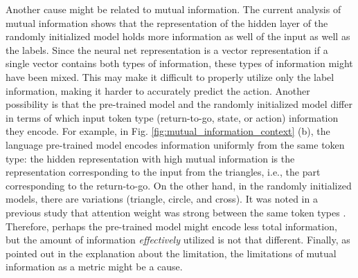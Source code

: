 \documentclass{article}
\begin{document}
Another cause might be related to mutual information. The current analysis of mutual information shows that the representation of the hidden layer of the randomly initialized model holds more information as well of the input as well as the labels. Since the neural net representation is a vector representation if a single vector contains both types of information, these types of information might have been mixed. This may make it difficult to properly utilize only the label information, making it harder to accurately predict the action. Another possibility is that the pre-trained model and the randomly initialized model differ in terms of which input token type (return-to-go, state, or action) information they encode. For example, in Fig. \ref{fig:mutual_information_context} (b), the language pre-trained model encodes information uniformly from the same token type: the hidden representation with high mutual information is the representation corresponding to the input from the triangles, i.e., the part corresponding to the return-to-go. On the other hand, in the randomly initialized models, there are variations (triangle, circle, and cross). It was noted in a previous study that attention weight was strong between the same token types \cite{reid2022can}. Therefore, perhaps the pre-trained model might encode less total information, but the amount of information \textit{effectively} utilized is not that different. Finally, as pointed out in the explanation about the limitation, the limitations of mutual information as a metric might be a cause.
\end{document}
